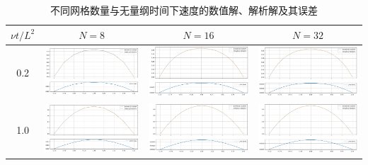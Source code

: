 \begin{landscape}
    \begin{table}[h]
        \renewcommand{\arraystretch}{3}
        \centering
        \caption{不同网格数量与无量纲时间下速度的数值解、解析解及其误差}\label{T:2-2-1}
        \begin{tabular}{c|ccc}
            $\nu t/L^2$ &                                                        $N=8$ &                                                        $N=16$ &                                                        $N=32$ \\ \hline
                    0.2 &  \includegraphics[height=0.23\textwidth]{figure/2/8-0.2.png} &  \includegraphics[height=0.23\textwidth]{figure/2/16-0.2.png} &  \includegraphics[height=0.23\textwidth]{figure/2/32-0.2.png} \\
                    1.0 &  \includegraphics[height=0.23\textwidth]{figure/2/8-1.0.png} &  \includegraphics[height=0.23\textwidth]{figure/2/16-1.0.png} &  \includegraphics[height=0.23\textwidth]{figure/2/32-1.0.png} \\

\end{tabular}
\end{table}
\end{landscape}
